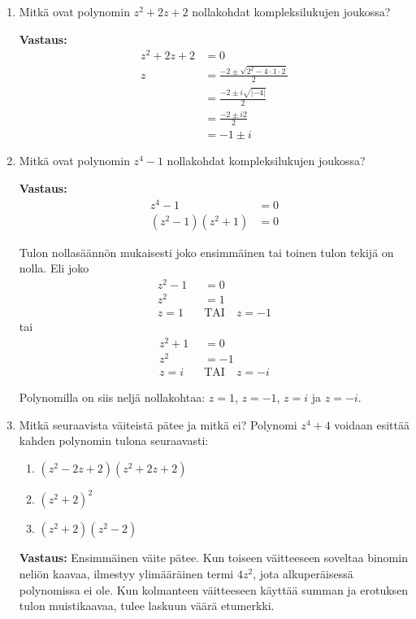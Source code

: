 \documentclass[a4paper,12pt]{article}
\begin{document}
\begin{enumerate}
\begin{enumerate}
    \item Mitk\"a ovat polynomin $z^2+2z+2$ nollakohdat kompleksilukujen joukossa?

    \textbf{Vastaus:}
    \begin{align*}
        z^2+2z+2&=0\\
        z&=\frac{-2\pm \sqrt{2^2-4\cdot 1\cdot 2}}{2}\\
        &=\frac{-2\pm i \sqrt{|-4|}}{2}\\
        &=\frac{-2\pm i 2}{2}\\
        &=-1\pm i
    \end{align*}
    
    \item  Mitk\"a ovat polynomin $z^4-1$ nollakohdat kompleksilukujen joukossa?
    
    \textbf{Vastaus:}
    \begin{align*}
        z^4-1&=0\\
        (z^2-1)(z^2+1)&=0
    \end{align*}

    Tulon nollasäännön mukaisesti joko ensimmäinen tai toinen tulon tekijä on nolla. Eli joko
    \begin{align*}
        z^2-1&=0\\
        z^2&=1\\
        z=1 \quad &\text{TAI} \quad z=-1
    \end{align*}
    tai
    \begin{align*}
        z^2+1&=0\\
        z^2&=-1\\
        z=i \quad &\text{TAI} \quad z=-i
    \end{align*}

    Polynomilla on siis neljä nollakohtaa: $z=1$, $z=-1$, $z=i$ ja $z=-i$.
    
    \item Mitkä seuraavista väiteistä pätee ja mitkä ei? Polynomi $z^4+4$ voidaan esitt\"a\"a kahden polynomin tulona seuraavasti: 
    \begin{enumerate}
        \item $(z^2-2z+2)(z^2+2z+2)$ 
        \item $(z^2+2)^2$ 
        \item $(z^2+2)(z^2-2)$
    \end{enumerate}

    \textbf{Vastaus:} Ensimmäinen väite pätee. Kun toiseen väitteeseen soveltaa binomin neliön kaavaa, ilmestyy ylimääräinen termi $4z^2$, jota alkuperäisessä polynomissa ei ole. Kun kolmanteen väitteeseen käyttää summan ja erotuksen tulon muistikaavaa, tulee laskuun väärä etumerkki. 
    
\end{enumerate}
\end{enumerate}
\end{document}
